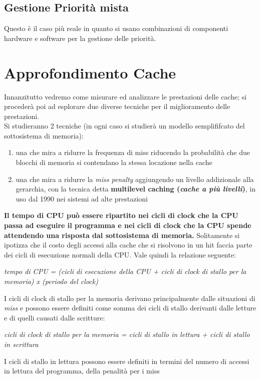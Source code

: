 \documentclass[a4paper,12pt, oneside]{book}
\begin{document}
\subsection{Gestione Priorità mista}
Questo è il caso più reale in quanto si usano combinazioni di
componenti hardware e software per la gestione delle priorità.\\
\section{Approfondimento Cache}
Innanzitutto vedremo come misurare ed analizzare le prestazioni delle
cache; si procederà poi ad esplorare due diverse tecniche
per il miglioramento delle prestazioni.\\
Si studieranno 2 tecniche (in ogni caso si studierà un modello
semplififcato del sottosistema di memoria):
\begin{enumerate}
  \item una che mira a ridurre la frequenza di miss riducendo la
  probabilità che due blocchi di memoria si
  contendano la stessa locazione nella cache
  \item una che mira a ridurre la \textit{miss penalty} aggiungendo un
  livello addizionale alla gerarchia, con la tecnica detta
  \textbf{multilevel caching (\textit{cache a più livelli})}, in uso
  dal 1990 nei sistemi ad alte prestazioni
\end{enumerate}
\textbf{Il tempo di CPU può essere ripartito nei cicli di clock che la
  CPU passa ad eseguire il programma e nei cicli di clock che la CPU
  spende attendendo una risposta dal sottosistema di memoria.}
Solitamente si ipotizza che il costo degli accessi alla
cache che si risolvono in un hit faccia parte dei cicli di esecuzione
normali della CPU. Vale quindi la relazione seguente:
\begin{center}
\textit{tempo di CPU = (cicli di esecuzione della CPU + cicli di clock di stallo
per la memoria) x (periodo del clock)}
\end{center}
I cicli di clock di stallo per la memoria derivano principalmente dalle
situazioni di \textit{miss} e possono essere definiti come somma dei cicli
di stallo derivanti dalle letture e di quelli causati dalle scritture:
\begin{center}
\textit{cicli di clock di stallo per la memoria =
cicli di stallo in lettura + cicli di stallo in scrittura}
\end{center}
I cicli di stallo in lettura possono essere definiti in termini del
numero di accessi in lettura del programma, della penalità per i miss
\end{document}
